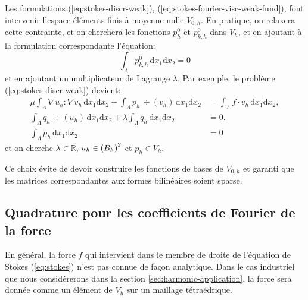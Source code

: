 \begin{remarque}
  Les formulations (\ref{eq:stokes-discr-weak}),
  (\ref{eq:stokes-fourier-visc-weak-fund}), font intervenir l'espace
  éléments finis à moyenne nulle $V_{0,h}$. En pratique, on
  relaxera cette contrainte, et on cherchera les fonctions $p^0_h$ et
  $p^0_{k,h}$ dans $V_{h}$, et en ajoutant à la formulation
  correspondante l'équation:
  \begin{equation}
    \int_\Lambda p^0_{k,h}\,\mathrm dx_1\mathrm dx_2 = 0
  \end{equation}
  et en ajoutant un multiplicateur de Lagrange $\lambda$. Par exemple, le
  problème (\ref{eq:stokes-discr-weak}) devient:
  \begin{equation}\label{eq:stokes-discr-weak}
    \begin{aligned}
      \mu \int_\Lambda \nabla u_h: \nabla v_h\,\mathrm dx_1\mathrm dx_2 +
      \int_\Lambda p_h\,\div(v_h)\,\mathrm dx_1\mathrm dx_2 &= \int_\Lambda
      f\cdot v_h\,\mathrm dx_1\mathrm dx_2,\\
      \int_\Lambda q_h\,\div(u_h)\,\mathrm dx_1\mathrm dx_2 + \lambda
      \int_\Lambda q_h\,\mathrm dx_1\mathrm dx_2 &= 0.\\
      \int_\Lambda p_h\,\mathrm dx_1\mathrm dx_2 &= 0
    \end{aligned}
  \end{equation}
  et on cherche $\lambda \in \mathbb R$, $u_h\in \left( B_h \right)^2$ et
  $p_h\in V_h$.

  Ce choix évite de devoir construire les fonctions de bases de
  $V_{0,h}$ et garanti que les matrices correspondantes aux formes
  bilinéaires soient sparse.
\end{remarque}

\subsection{Quadrature pour les coefficients de Fourier de la force}
En général, la force $f$ qui intervient dans le membre de droite
de l'équation de Stokes (\ref{eq:stokes}) n'est pas connue de fa\c
con analytique. Dans le cas industriel que nous considérerons dans
la section \ref{sec:harmonic-application}, la force sera donnée
comme un élément de $V_h$ sur un maillage tétraédrique.

